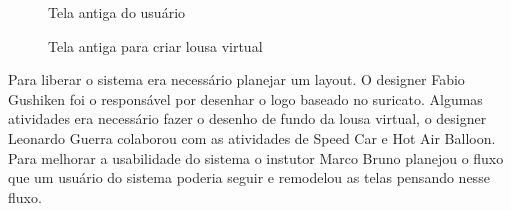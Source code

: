 \begin{figure}[H]
  \centering
  \caption{Tela antiga do usuário}\label{figura:indexAntigo}
\end{figure}

\begin{figure}[H]
  \centering
  \caption{Tela antiga para criar lousa virtual}\label{figura:criarAntigo}
\end{figure}

Para liberar o sistema era necessário planejar um layout. O designer Fabio Gushiken foi o responsável por desenhar o logo baseado no suricato. Algumas atividades era necessário fazer o desenho de fundo da lousa virtual, o designer Leonardo Guerra colaborou com as atividades de Speed Car e Hot Air Balloon. Para melhorar a usabilidade do sistema o instutor Marco Bruno planejou o fluxo que um usuário do sistema poderia seguir e remodelou as telas pensando nesse fluxo.

